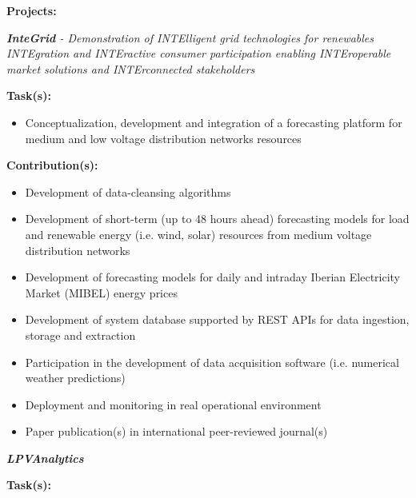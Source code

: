 \documentclass{mycv}
\begin{document}
\textbf{Projects:}
\vspace{0.1cm}

\begin{myitemize}	
	\item \textit{\textbf{InteGrid} - Demonstration of INTElligent grid technologies for renewables INTEgration and INTEractive consumer participation enabling INTEroperable market solutions and INTErconnected stakeholders}
	
		\vspace{0.4cm}
		\textbf{Task(s):}
		
		\begin{itemize}[itemsep=1px]
		\item Conceptualization, development and integration of a forecasting platform for medium and low voltage distribution networks resources
		\end{itemize}
	
		\vspace{0.2cm}
		\textbf{Contribution(s):}
		
		\begin{itemize}[itemsep=1px]
		\item Development of data-cleansing algorithms
		\item Development of short-term (up to 48 hours ahead) forecasting models for load and renewable energy (i.e. wind, solar) resources from medium voltage distribution networks
		\item Development of forecasting models for daily and intraday Iberian Electricity Market (MIBEL) energy prices
		\item Development of system database supported by REST APIs for data ingestion, storage and extraction
		\item Participation in the development of data acquisition software (i.e. numerical weather predictions)
		\item Deployment and monitoring in real operational environment
		\item Paper publication(s) in international peer-reviewed journal(s)
		\end{itemize}
	
		\vspace{0.2cm}
		
	
	\vspace{0.6cm}	
	
	\item \textit{\textbf{LPVAnalytics}}
	
		\vspace{0.4cm}
		\textbf{Task(s):}
		

\end{myitemize}
\end{document}
